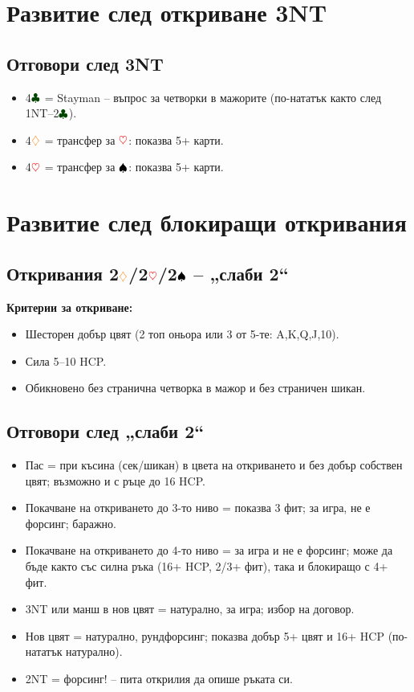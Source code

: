 \documentclass[10pt,a5paper]{extarticle}
\newcommand{\Rheart}{\textcolor{red}{\heartsuit}}
\newcommand{\Rdiamond}{\textcolor{orange}{\diamondsuit}}
\newcommand{\Bspade}{\textcolor{black}{\spadesuit}}
\newcommand{\Bclub}{\textcolor{darkgreen}{\clubsuit}}
\begin{document}
\section{Развитие след откриване 3NT}

\subsection*{Отговори след 3NT}
\begin{itemize}
  \item[] 4$\Bclub$ = Stayman – въпрос за четворки в мажорите  
  (по-нататък както след 1NT–2$\Bclub$).
  \item[] 4$\Rdiamond$ = трансфер за $\Rheart$: показва 5+ карти.
  \item[] 4$\Rheart$ = трансфер за $\Bspade$: показва 5+ карти.
\end{itemize}

\section{Развитие след блокиращи откривания}

\subsection*{Откривания 2$\Rdiamond$/2$\Rheart$/2$\Bspade$ – „слаби 2“}
\textbf{Критерии за откриване:}
\begin{itemize}
  \item[] Шесторен добър цвят (2 топ оньора или 3 от 5-те: A,K,Q,J,10).
  \item[] Сила 5–10 HCP.
  \item[] Обикновено без странична четворка в мажор и без страничен шикан.
\end{itemize}

\subsection*{Отговори след „слаби 2“}
\begin{itemize}
  \item[] Пас = при късина (сек/шикан) в цвета на откриването и без добър собствен цвят; възможно и с ръце до 16 HCP.
  \item[] Покачване на откриването до 3-то ниво = показва 3 фит; за игра, не е форсинг; баражно.
  \item[] Покачване на откриването до 4-то ниво = за игра и не е форсинг; може да бъде както със силна ръка (16+ HCP, 2/3+ фит), така и блокиращо с 4+ фит.
  \item[] 3NT или манш в нов цвят = натурално, за игра; избор на договор.
  \item[] Нов цвят = натурално, рундфорсинг; показва добър 5+ цвят и 16+ HCP (по-нататък натурално).
  \item[] 2NT = форсинг! – пита открилия да опише ръката си.
\end{itemize}
\newpage
\end{document}
